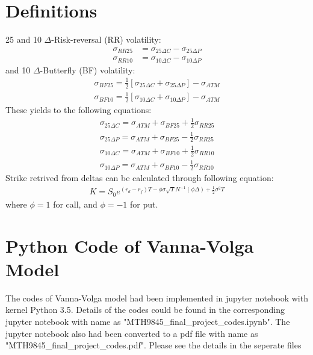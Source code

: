 \newpage
\section{Definitions}
25 and 10 $\Delta$-Risk-reversal (RR) volatility:
\begin{align}
\sigma_{RR25}&=\sigma_{25\Delta C}-\sigma_{25\Delta P}\\
\sigma_{RR10}&=\sigma_{10\Delta C}-\sigma_{10\Delta P}
\end{align}
 and 10 $\Delta$-Butterfly (BF) volatility:
\begin{align}
\sigma_{BF25}=\frac{1}{2}\left[\sigma_{25\Delta C}+\sigma_{25\Delta P}\right]-\sigma_{ATM}\\
\sigma_{BF10}=\frac{1}{2}\left[\sigma_{10\Delta C}+\sigma_{10\Delta P}\right]-\sigma_{ATM}
\end{align}
\newline
These yields to the following equations:
\begin{align}
\sigma_{25\Delta C}=\sigma_{ATM}+\sigma_{BF25}+\frac{1}{2}\sigma_{RR25}\\
\sigma_{25\Delta P}=\sigma_{ATM}+\sigma_{BF25}-\frac{1}{2}\sigma_{RR25}\\
\sigma_{10\Delta C}=\sigma_{ATM}+\sigma_{BF10}+\frac{1}{2}\sigma_{RR10}\\
\sigma_{10\Delta P}=\sigma_{ATM}+\sigma_{BF10}-\frac{1}{2}\sigma_{RR10}
\end{align}
\newline
Strike retrived from deltas can be calculated through following equation:
\begin{align}
K=S_0e^{(r_d-r_f)T-\phi \sigma \sqrt{T} N^{-1}(\phi \Delta)+\frac{1}{2}\sigma^2T}
\end{align}
where $\phi=1$ for call, and $\phi=-1$ for put.

\section{Python Code of Vanna-Volga Model}
The codes of Vanna-Volga model had been implemented in jupyter notebook with kernel Python 3.5. Details of the codes could be found in the corresponding jupyter notebook with name as "MTH9845\_final\_project\_codes.ipynb". The jupyter notebook also had been converted to a pdf file with name as "MTH9845\_final\_project\_codes.pdf". Please see the details in the seperate files
